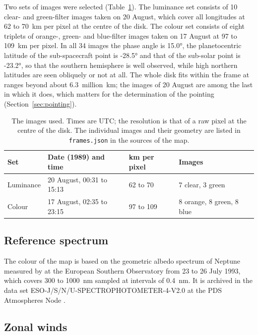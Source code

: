 \documentclass[11pt,a4paper]{article}
\begin{document}
Two sets of images were selected (Table~\ref{tab:frames}). The luminance set consists of 10 clear-
and green-filter images taken on 20 August, which cover all longitudes at 62 to 70~km per pixel
at the centre of the disk. The colour set consists of eight triplets of orange-, green- and
blue-filter images taken on 17 August at 97 to 109~km per pixel. In all 34 images the phase angle
is \ang{15.0}, the planetocentric latitude of the sub-spacecraft point is \ang{-28.5} and that of
the sub-solar point is \ang{-23.2}, so that the southern hemisphere is well observed, while high
northern latitudes are seen obliquely or not at all. The whole disk fits within the frame at ranges
beyond about 6.3~million~km; the images of 20 August are among the last in which it does, which
matters for the determination of the pointing (Section~\ref{sec:pointing}).

\begin{table}[htbp]
\centering
\caption{The images used. Times are UTC; the resolution is that of a raw pixel at the centre of
the disk. The individual images and their geometry are listed in \texttt{frames.json} in the
sources of the map.}
\label{tab:frames}
\begin{tabular}{llll}
\toprule
Set & Date (1989) and time & km per pixel & Images \\
\midrule
Luminance & 20 August, 00:31 to 15:13 & 62 to 70 & 7 clear, 3 green \\
Colour & 17 August, 02:35 to 23:15 & 97 to 109 & 8 orange, 8 green, 8 blue \\
\bottomrule
\end{tabular}
\end{table}

\subsection{Reference spectrum}

The colour of the map is based on the geometric albedo spectrum of Neptune measured by
\citet{karkoschka1994} at the European Southern Observatory from 23 to 26 July 1993, which covers
300 to 1000~nm sampled at intervals of 0.4~nm. It is archived in the data set
ESO-J/S/N/U-SPECTROPHOTOMETER-4-V2.0 at the PDS Atmospheres Node \citep{karkoschka1998}.

\subsection{Zonal winds}
\end{document}
